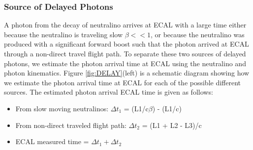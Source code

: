 \subsubsection*{Source of Delayed Photons}
A photon from the decay of neutralino arrives at ECAL with a large time either because the neutralino is traveling slow \ie $\beta << 1$, or because the neutralino was produced with a significant forward boost such that the photon arrived at ECAL through a non-direct travel flight path. To separate these two sources of delayed photons, we estimate the photon arrival time at ECAL using the neutralino and photon  kinematics. Figure \ref{fig:DELAY}(left) is a schematic diagram showing how we estimate the photon arrival time at ECAL for each of the possible different sources. The estimated photon arrival ECAL time is given as follows:
\begin{itemize}
  \item From slow moving neutralinos: $\Delta t_1$ = (L1/c$\beta$) - (L1/c)
  \item From non-direct traveled flight path: $\Delta t_2$ = (L1 + L2 - L3)/c
  \item ECAL measured time = $\Delta t_{1} + \Delta t_{2}$
\end{itemize}

